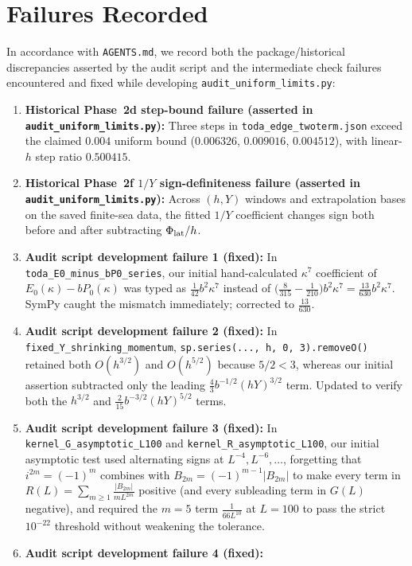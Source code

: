 \documentclass[11pt,a4paper]{article}
\newcommand{\scr}[1]{\texttt{#1}}
\begin{document}
\section{Failures Recorded}

In accordance with \scr{AGENTS.md}, we record both the package/historical
discrepancies asserted by the audit script and the intermediate check failures
encountered and fixed while developing \scr{audit\_uniform\_limits.py}:
\begin{enumerate}
\item \textbf{Historical Phase~2d step-bound failure (asserted in \scr{audit\_uniform\_limits.py}):}
Three steps in \scr{toda\_edge\_twoterm.json} exceed the claimed $0.004$ uniform
bound ($0.006326$, $0.009016$, $0.004512$), with linear-$h$ step ratio $0.500415$.
\item \textbf{Historical Phase~2f $1/Y$ sign-definiteness failure (asserted in \scr{audit\_uniform\_limits.py}):}
Across $(h,Y)$ windows and extrapolation bases on the saved finite-sea data, the
fitted $1/Y$ coefficient changes sign both before and after subtracting
$\Phi_{\rm lat}/h$.
\item \textbf{Audit script development failure 1 (fixed):}
In \texttt{toda\_E0\_minus\_bP0\_series}, our initial hand-calculated $\kappa^7$
coefficient of $E_0(\kappa)-bP_0(\kappa)$ was typed as $\frac{1}{42}b^2\kappa^7$
instead of $\bigl(\frac{8}{315}-\frac{1}{210}\bigr)b^2\kappa^7=\frac{13}{630}b^2\kappa^7$.
SymPy caught the mismatch immediately; corrected to $\frac{13}{630}$.
\item \textbf{Audit script development failure 2 (fixed):}
In \texttt{fixed\_Y\_shrinking\_momentum}, \texttt{sp.series(..., h, 0, 3).removeO()}
retained both $O(h^{3/2})$ and $O(h^{5/2})$ because $5/2<3$, whereas our initial
assertion subtracted only the leading $\frac43 b^{-1/2}(hY)^{3/2}$ term. Updated
to verify both the $h^{3/2}$ and $\frac{2}{15}b^{-3/2}(hY)^{5/2}$ terms.
\item \textbf{Audit script development failure 3 (fixed):}
In \texttt{kernel\_G\_asymptotic\_L100} and \texttt{kernel\_R\_asymptotic\_L100},
our initial asymptotic test used alternating signs at $L^{-4},L^{-6},\dots$,
forgetting that $i^{2m}=(-1)^m$ combines with $B_{2m}=(-1)^{m-1}|B_{2m}|$ to make
every term in $R(L)=\sum_{m\ge 1}\frac{|B_{2m}|}{mL^{2m}}$ positive (and every
subleading term in $G(L)$ negative), and required the $m=5$ term
$\frac{1}{66L^{10}}$ at $L=100$ to pass the strict $10^{-22}$ threshold without
weakening the tolerance.
\item \textbf{Audit script development failure 4 (fixed):}

\end{enumerate}
\end{document}
